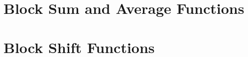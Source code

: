 \section{Block Sum and Average Functions}
\label{cbmf0:sbsa0}


\section{Block Shift Functions}
\label{cbmf0:sbsh0}

%
%
%
%
%
